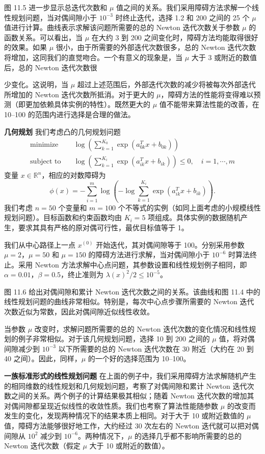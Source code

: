 \documentclass[UTF8, 12pt, fontset=fandol, oneside]{ctexart}
\begin{document}
图 11.5 进一步显示总迭代次数和 $\mu$ 值之间的关系。我们采用障碍方法求解一个线性规划问题，当对偶间隙小于 $10^{-3}$ 时终止迭代，选择 1.2 和 200 之间的 25 个 $\mu$ 值进行计算。曲线表示求解该问题所需要的总的 Newton 迭代次数关于参数 $\mu$ 的函数关系。可以看出，当 $\mu$ 在大约 3 到 200 之间变化时，障碍方法均能取得很好的效果。如果 $\mu$ 很小，由于所需要的外部迭代次数很多，总的 Newton 迭代次数将增加，这同我们的直觉吻合。一个有意义的现象是，当 $\mu$ 大于 3 或附近的数值后，总的 Newton 迭代次数很

少变化。这说明，当 $\mu$ 超过上述范围后，外部迭代次数的减少将被每次外部迭代所增加的 Newton 迭代次数所抵消。对于更大的 $\mu$，障碍方法的性能将变得难以预测（即更加依赖具体实例的特性）。既然更大的 $\mu$ 值不能带来算法性能的改善，在 10--100 的范围内进行选择是合理的做法。

\noindent\textbf{几何规划}\quad
我们考虑凸的几何规划问题
\[
\begin{aligned}
\text{minimize}\quad & \log\left(\sum_{k=1}^{K_0}\exp(a_{0k}^Tx+b_{0k})\right)\\
\text{subject to}\quad & \log\left(\sum_{k=1}^{K_i}\exp(a_{ik}^Tx+b_{ik})\right)\leq 0,\quad i=1,\cdots,m
\end{aligned}
\]
变量 $x\in\mathbb{R}^n$，相应的对数障碍为
\[
\phi(x)=-\sum_{i=1}^m\log\left(-\log\sum_{k=1}^{K_i}\exp(a_{ik}^Tx+b_{ik})\right).
\]
我们考虑 $n=50$ 个变量和 $m=100$ 个不等式的实例（如同上面考虑的小规模线性规划问题）。目标函数和约束函数均由 $K_i=5$ 项组成。具体实例的数据随机产生，要求其具有严格的原对偶可行性，最优目标值等于 1。

我们从中心路径上一点 $x^{(0)}$ 开始迭代，其对偶间隙等于 100。分别采用参数 $\mu=2$，$\mu=50$ 和 $\mu=150$ 的障碍方法进行求解，当对偶间隙小于 $10^{-6}$ 时算法终止。采用 Newton 方法求解中心点问题，其参数设置和线性规划例子相同，即 $\alpha=0.01$，$\beta=0.5$，终止准则为 $\lambda(x)^2/2\leq 10^{-5}$。

图 11.6 给出对偶间隙和累计 Newton 迭代次数之间的关系。该曲线和图 11.4 中的
线性规划问题的曲线非常相似。特别是，每次中心点步骤所需要的 Newton 迭代次数近似为常数，因此对偶间隙近似线性收敛。

当参数 $\mu$ 改变时，求解问题所需要的总的 Newton 迭代次数的变化情况和线性规划的例子非常相似。对于该几何规划问题，选择 10 到 200 之间的 $\mu$ 值，将对偶间隙减少到 $10^{-3}$ 以下所需要的总的 Newton 迭代次数在 30 附近（大约在 20 到 40 之间）。因此，同样，$\mu$ 的一个好的选择范围为 10--100。

\noindent\textbf{一族标准形式的线性规划问题}\quad
在上面的例子中，我们采用障碍方法求解随机产生的相同维数的线性规划和几何规划问题，考察了对偶间隙和累计 Newton 迭代次数之间的关系。两个例子的计算结果极其相似；随着 Newton 迭代次数的增加其对偶间隙都呈现近似线性的收敛性质。我们也考察了算法性能随参数 $\mu$ 的改变而发生的变化，发现两种情况下的结果本质上相同。对于大于 10 或附近数值的 $\mu$ 值，障碍方法能够很好地工作，大约经过 30 次左右的 Newton 迭代就可以把对偶间隙从 $10^2$ 减少到 $10^{-6}$。两种情况下，$\mu$ 的选择几乎都不影响所需要的总的 Newton 迭代次数（假定 $\mu$ 大于 10 或附近的数值）。
\end{document}
